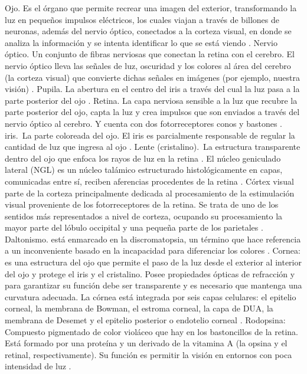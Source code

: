\documentclass[10pt]{article}
\begin{document}
Ojo. Es el órgano que permite recrear una imagen del exterior, transformando la luz en pequeños impulsos eléctricos, los cuales viajan a través de billones de neuronas, además del nervio óptico, conectados a la corteza visual, en donde se analiza la información y se intenta identificar lo que se está viendo \cite{IEEEreferencias:Ref34}. 
Nervio óptico. Un conjunto de fibras nerviosas que conectan la retina con el cerebro. El nervio óptico lleva las señales de luz, oscuridad y los colores al área del cerebro (la corteza visual) que convierte dichas señales en imágenes (por ejemplo, nuestra visión) \cite{IEEEreferencias:Ref35}.
Pupila. La abertura en el centro del iris a través del cual la luz pasa a la parte posterior del ojo \cite{IEEEreferencias:Ref35}. 
Retina. La capa nerviosa sensible a la luz que recubre la parte posterior del ojo, capta la luz y crea impulsos que son enviados a través del nervio óptico al cerebro. Y cuenta con dos fotorreceptores conos y bastones \cite{IEEEreferencias:Ref35}. 
iris. La parte coloreada del ojo. El iris es parcialmente responsable de regular la cantidad de luz que ingresa al ojo \cite{IEEEreferencias:Ref35}. 
Lente (cristalino). La estructura transparente dentro del ojo que enfoca los rayos de luz en la retina \cite{IEEEreferencias:Ref35}. 
El núcleo geniculado lateral (NGL) es un núcleo talámico estructurado histológicamente en capas, comunicadas entre sí, reciben aferencias procedentes de la retina \cite{IEEEreferencias:Ref36}. 
Córtex visual parte de la corteza principalmente dedicada al procesamiento de la estimulación visual proveniente de los fotorreceptores de la retina. Se trata de uno de los sentidos más representados a nivel de corteza, ocupando su procesamiento la mayor parte del lóbulo occipital y una pequeña parte de los parietales \cite{IEEEreferencias:Ref37}. 
Daltonismo. está enmarcado en la discromatopsia, un término que hace referencia a un inconveniente basado en la incapacidad para diferenciar los colores \cite{IEEEreferencias:Ref1}. 
Cornea: es una estructura del ojo que permite el paso de la luz desde el exterior al interior del ojo y protege el iris y el cristalino. Posee propiedades ópticas de refracción y para garantizar su función debe ser transparente y es necesario que mantenga una curvatura adecuada. La córnea está integrada por seis capas celulares: el epitelio corneal, la membrana de Bowman, el estroma corneal, la capa de DUA, la membrana de Desemet y el epitelio posterior o endotelio corneal \cite{IEEEreferencias:Ref6}.
Rodopsina: Compuesto pigmentado de color violáceo que hay en los bastoncillos de la retina. Está formado por una proteína y un derivado de la vitamina A (la opsina y el retinal, respectivamente). Su función es permitir la visión en entornos con poca intensidad de luz \cite{IEEEreferencias:Ref38}.
\end{document}
